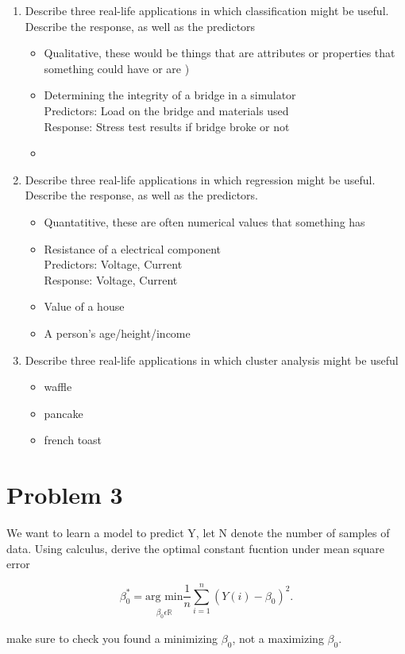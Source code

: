 \documentclass[11pt]{article}
\newcommand\tab[1][1cm]{\hspace*{#1}}
\begin{document}
\begin{enumerate}[label=(\alph*)]
    \item Describe three real-life applications in which classification might be useful. Describe the response, as well as the predictors
          \begin{itemize}
              \item Qualitative, these would be things that are attributes or properties that something could have or are )
              \item Determining the integrity of a bridge in a simulator \\\tab Predictors: Load on the bridge and materials used \\\tab Response: Stress test results if bridge broke or not
              \item
          \end{itemize}
    \item Describe three real-life applications in which regression might be useful. Describe the response, as well as the predictors.
          \begin{itemize}
              \item Quantatitive, these are often numerical values that something has
              \item Resistance of a electrical component \\\tab Predictors: Voltage, Current \\\tab Response: Voltage, Current
              \item Value of a house
              \item A person's age/height/income
          \end{itemize}
    \item Describe three real-life applications in which cluster analysis might be useful
          \begin{itemize}
              \item waffle
              \item pancake
              \item french toast
          \end{itemize}
\end{enumerate}


\pagebreak
\section{Problem 3}
We want to learn a model to predict Y, let N denote the number of samples of data. Using calculus, derive the optimal constant fucntion under mean square error
\begin{center}
    \[
        \beta_{0}^{*} = \underset{\substack{\\ \beta_{0} \epsilon \mathbb{R} } } {\text{arg min} } \frac{1}{n} \sum_{i = 1}^{n}(Y(i) - \beta_{0})^{2} \text{.}
    \]
\end{center}
make sure to check you found a minimizing $\beta_{0}$, not a maximizing $\beta_{0}$.\\



\end{document}
